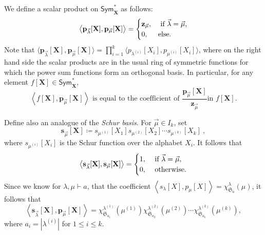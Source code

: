 \documentclass[ALCO,Unicode]{cedram}
\newcommand{\defncolor}{\color{darkred}}
\newcommand{\defn}[1]{{\defncolor\emph{#1}}} %
\newcommand{\XXX}{\mathbf{X}}
\begin{document}
We define a scalar product on $\mathsf{Sym}^\ast_{\XXX}$ as follows:
\begin{equation}\label{eq:defspsym}
    \left< \mathbf{p}_{\vec{\lambda}}[\XXX], \mathbf{p}_{\vec{\mu}}[\XXX] \right> =
    \begin{cases}\mathbf{z}_{\vec{\mu}}, &\hbox{ if }\vec{\lambda} = \vec{\mu},\\
    0,&\hbox{else.}\end{cases}
\end{equation}
Note that $\big\langle \mathbf{p}_{\vec{\lambda}}[\XXX], \mathbf{p}_{\vec{\mu}}[\XXX] \big\rangle
= \prod_{i=1}^{k} \big\langle p_{\lambda^{(i)}}[X_i], p_{\mu^{(i)}}[X_i] \big\rangle$,
where on the right hand side the scalar products are in the
usual ring of symmetric functions for which the power sum functions form an orthogonal basis.
In particular, for any element $f[\XXX] \in \mathsf{Sym}^\ast_\XXX$,
\begin{equation}
\label{eq:scalar-product-with-power-sums}
\text{$\left< f[\XXX], \mathbf{p}_{\vec{\mu}}[\XXX] \right>$ is equal
to the coefficient of $\frac{\mathbf{p}_{\vec{\mu}}[\XXX]}{\mathbf{z}_{\vec{\mu}}}$
in $f[\XXX]$.}
\end{equation}

Define also an analogue of the \defn{Schur basis}.  For
$\vec{\mu} \in I_k$, set
\[
    \mathbf{s}_{\vec{\mu}}[\XXX] \coloneqq
    s_{\mu^{(1)}}[X_1] s_{\mu^{(2)}}[X_2] \cdots s_{\mu^{(k)}}[X_k]~,
\]
where $s_{\mu^{(i)}}[X_i]$ is the Schur function over the alphabet $X_i$.
It follows that
\begin{equation}\label{eq:sorthonormal}
    \left< \mathbf{s}_{\vec{\lambda}}[\XXX],
    \mathbf{s}_{\vec{\mu}}[\XXX] \right> =
    \begin{cases}
    1,&\hbox{ if }\vec{\lambda} = \vec{\mu},\\
    0,&\hbox{ otherwise.}
    \end{cases}
\end{equation}
Since we know for $\lambda, \mu \vdash a$, that the coefficient $\left< s_\lambda[X], p_\mu[X] \right> = \chi^{\lambda}_{\mathfrak{S}_a}(\mu)$, 
it follows that 
\begin{equation}\label{eq:spval}
\left< \mathbf{s}_{\vec{\lambda}}[\XXX],
\mathbf{p}_{\vec{\mu}}[\XXX] \right> =
\chi^{\lambda^{(1)}}_{\mathfrak{S}_{a_1}}(\mu^{(1)})
\chi^{\lambda^{(2)}}_{\mathfrak{S}_{a_2}}(\mu^{(2)})
\cdots
\chi^{\lambda^{(k)}}_{\mathfrak{S}_{a_k}}(\mu^{(k)}),
\end{equation}
where $a_i = |\lambda^{(i)}|$ for $1 \leqslant i \leqslant k$.
\end{document}
